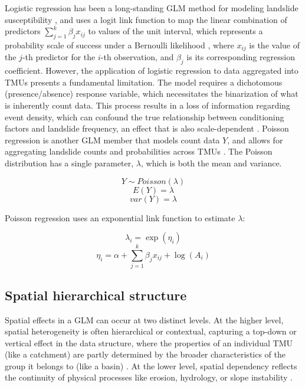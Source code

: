 \documentclass[journal abbreviation, manuscript]{copernicus}
\begin{document}
Logistic regression has been a long-standing GLM method for modeling landslide susceptibility \citep{david2000applied, ayalew2005application}, and uses a logit link function to map the linear combination of predictors $\sum_{j=1}^k \beta_j x_{ij}$ to values of the unit interval, which represents a probability scale of success under a Bernoulli likelihood \citep{david2000applied}, where $x_{ij}$ is the value of the $j$-th predictor for the $i$-th observation, and $\beta_{j}$ is its corresponding regression coefficient. However, the application of logistic regression to data aggregated into TMUs presents a fundamental limitation. The model requires a dichotomous (presence/absence) response variable, which necessitates the binarization of what is inherently count data. This process results in a loss of information regarding event density, which can confound the true relationship between conditioning factors and landslide frequency, an effect that is also scale-dependent \citep{lombardo2018point}. Poisson regression is another GLM member that models count data $Y$, and allows for aggregating landslide counts and probabilities across TMUs \citep{tay2014landslide, opitz2022high}. The Poisson distribution has a single parameter, $\lambda$, which is both the mean and variance.

\begin{equation}
Y \sim Poisson(\lambda)
\end{equation}
\begin{equation}
E(Y) = \lambda
\end{equation}
\begin{equation}
var(Y) = \lambda
\end{equation}

Poisson regression uses an exponential link function to estimate $\lambda$:

\begin{equation}
\lambda_i = \exp(\eta_i)
\end{equation}
\begin{equation}
\eta_i = \alpha + \sum_{j=1}^k \beta_j x_{ij} + \log(A_i)
\end{equation}


\subsection{Spatial hierarchical structure}\label{subsec21}

Spatial effects in a GLM can occur at two distinct levels. At the higher level, spatial heterogeneity is often hierarchical or contextual, capturing a top-down or vertical effect in the data structure, where the properties of an individual TMU (like a catchment) are partly determined by the broader characteristics of the group it belongs to (like a basin) \citep{corrado2011multilevel}. At the lower level, spatial dependency reflects the continuity of physical processes like erosion, hydrology, or slope instability \citep{cellmer2019application}.
\end{document}
